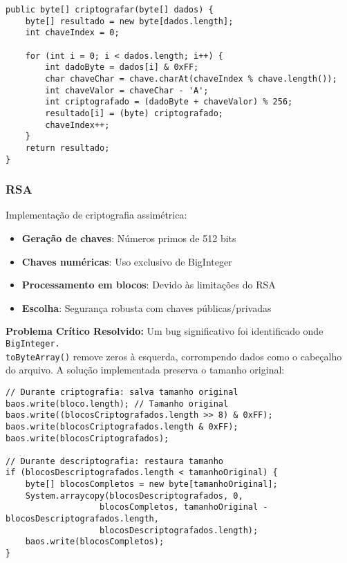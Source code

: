 \documentclass[12pt,a4paper]{article}
\begin{document}
\begin{lstlisting}[style=javastyle]
public byte[] criptografar(byte[] dados) {
    byte[] resultado = new byte[dados.length];
    int chaveIndex = 0;
    
    for (int i = 0; i < dados.length; i++) {
        int dadoByte = dados[i] & 0xFF;
        char chaveChar = chave.charAt(chaveIndex % chave.length());
        int chaveValor = chaveChar - 'A';
        int criptografado = (dadoByte + chaveValor) % 256;
        resultado[i] = (byte) criptografado;
        chaveIndex++;
    }
    return resultado;
}
\end{lstlisting}

\subsubsection{RSA}

Implementação de criptografia assimétrica:
\begin{itemize}
    \item \textbf{Geração de chaves}: Números primos de 512 bits
    \item \textbf{Chaves numéricas}: Uso exclusivo de BigInteger
    \item \textbf{Processamento em blocos}: Devido às limitações do RSA
    \item \textbf{Escolha}: Segurança robusta com chaves públicas/privadas
\end{itemize}

\textbf{Problema Crítico Resolvido:}
Um bug significativo foi identificado onde \texttt{BigInteger.\\toByteArray()} remove zeros à esquerda, corrompendo dados como o cabeçalho do arquivo. A solução implementada preserva o tamanho original:

\begin{lstlisting}[style=javastyle]
// Durante criptografia: salva tamanho original
baos.write(bloco.length); // Tamanho original
baos.write((blocosCriptografados.length >> 8) & 0xFF);
baos.write(blocosCriptografados.length & 0xFF);
baos.write(blocosCriptografados);

// Durante descriptografia: restaura tamanho
if (blocosDescriptografados.length < tamanhoOriginal) {
    byte[] blocosCompletos = new byte[tamanhoOriginal];
    System.arraycopy(blocosDescriptografados, 0, 
                   blocosCompletos, tamanhoOriginal - blocosDescriptografados.length, 
                   blocosDescriptografados.length);
    baos.write(blocosCompletos);
}
\end{lstlisting}
\end{document}
